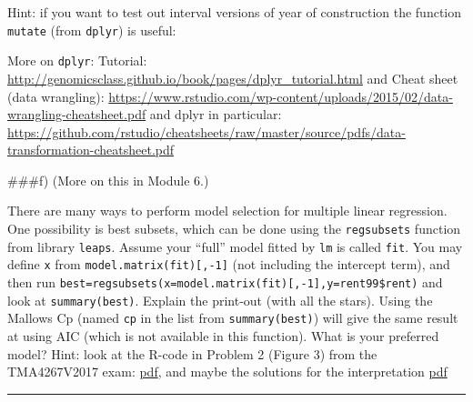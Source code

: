 \documentclass[]{article}
\newenvironment{Shaded}{\begin{snugshade}}{\end{snugshade}}
\newcommand{\DataTypeTok}[1]{\textcolor[rgb]{0.13,0.29,0.53}{#1}}
\newcommand{\DecValTok}[1]{\textcolor[rgb]{0.00,0.00,0.81}{#1}}
\newcommand{\KeywordTok}[1]{\textcolor[rgb]{0.13,0.29,0.53}{\textbf{#1}}}
\newcommand{\NormalTok}[1]{#1}
\newcommand{\OperatorTok}[1]{\textcolor[rgb]{0.81,0.36,0.00}{\textbf{#1}}}
\newcommand{\OtherTok}[1]{\textcolor[rgb]{0.56,0.35,0.01}{#1}}
\newcommand{\StringTok}[1]{\textcolor[rgb]{0.31,0.60,0.02}{#1}}
\begin{document}
Hint: if you want to test out interval versions of year of construction
the function \texttt{mutate} (from \texttt{dplyr}) is useful:

\begin{Shaded}
\end{Shaded}

More on \texttt{dplyr}: Tutorial:
\url{http://genomicsclass.github.io/book/pages/dplyr_tutorial.html} and
Cheat sheet (data wrangling):
\url{https://www.rstudio.com/wp-content/uploads/2015/02/data-wrangling-cheatsheet.pdf}
and dplyr in particular:
\url{https://github.com/rstudio/cheatsheets/raw/master/source/pdfs/data-transformation-cheatsheet.pdf}

\#\#\#f) (More on this in Module 6.)

There are many ways to perform model selection for multiple linear
regression. One possibility is best subsets, which can be done using the
\texttt{regsubsets} function from library \texttt{leaps}. Assume your
``full'' model fitted by \texttt{lm} is called \texttt{fit}. You may
define \texttt{x} from \texttt{model.matrix(fit){[},-1{]}} (not
including the intercept term), and then run
\texttt{best=regsubsets(x=model.matrix(fit){[},-1{]},y=rent99\$rent)}
and look at \texttt{summary(best)}. Explain the print-out (with all the
stars). Using the Mallows Cp (named \texttt{cp} in the list from
\texttt{summary(best)}) will give the same result at using AIC (which is
not available in this function). What is your preferred model? Hint:
look at the R-code in Problem 2 (Figure 3) from the TMA4267V2017 exam:
\href{https://www.math.ntnu.no/emner/TMA4267/2017v/Exam/eV2017Enew.pdf}{pdf},
and maybe the solutions for the interpretation
\href{https://www.math.ntnu.no/emner/TMA4267/2017v/Exam/mergedLFV2017.pdf}{pdf}

\begin{center}\rule{0.5\linewidth}{\linethickness}\end{center}
\end{document}
